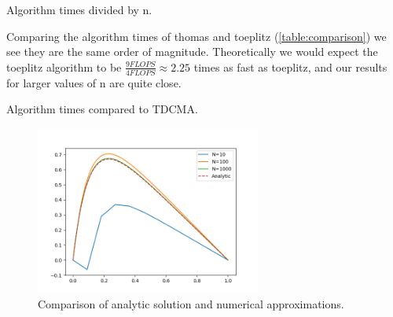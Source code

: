 \begin{table}[htp]
  \centering
  \caption{Algorithm times divided by n.}
  \label{table:normalized}
\end{table}


Comparing the algorithm times of thomas and toeplitz (\cref{table:comparison})
we see they are the same order of magnitude. Theoretically we would
expect the toeplitz algorithm to be $\frac{9 FLOPS}{4 FLOPS} \approx 2.25$ times as fast as
toeplitz, and our results for larger values of n are quite close.

\begin{table}[htp]
  \centering
  \caption{Algorithm times compared to TDCMA.}
  \label{table:comparison}
\end{table}


\begin{figure}[htp]
  \centering
  \includegraphics[width=0.66\textwidth]{../figures/TDMA.png}
  \caption{Comparison of analytic solution and numerical approximations.}
  \label{fig:a}
\end{figure}
